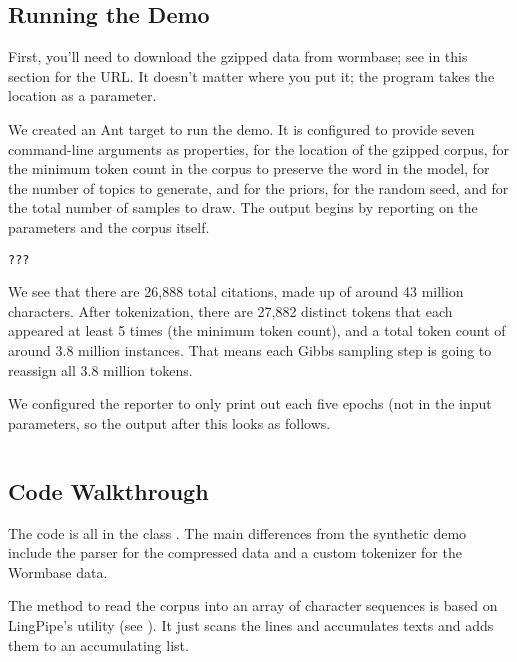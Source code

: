 \subsection{Running the Demo}

First, you'll need to download the gzipped data from wormbase; see
 in this section for the URL.  It
doesn't matter where you put it; the program takes the location as
a parameter.

We created an Ant target  to run the demo.  It is
configured to provide seven command-line arguments as properties,
 for the location of the gzipped corpus,
 for the minimum token count in the corpus to
preserve the word in the model,  for the number of
topics to generate,  and  for the
priors,  for the random seed, and 
for the total number of samples to draw.
%
%
The output begins by reporting on the parameters and the corpus itself.
%
\begin{verbatim}
???
\end{verbatim}
%
We see that there are 26,888 total citations, made up of around 43
million characters.  After tokenization, there are 27,882 distinct
tokens that each appeared at least 5 times (the minimum token count),
and a total token count of around 3.8 million instances.  That means
each Gibbs sampling step is going to reassign all 3.8 million tokens.

We configured the reporter to only print out each five epochs (not
in the input parameters, so the output after this looks as follows.
%
\begin{verbatim}

\end{verbatim}


\subsection{Code Walkthrough}

The code is all in the class .  The main differences
from the synthetic demo include the parser for the compressed data and
a custom tokenizer for the Wormbase data.  

The method to read the corpus into an array of character sequences is
based on LingPipe's  utility (see
).  It just scans the lines and
accumulates texts and adds them to an accumulating list.

